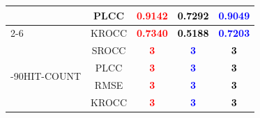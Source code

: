 \documentclass{article}
\begin{document}
\begin{table}
\begin{tabular}{||l|l|l||ccc||}
&\multicolumn{2}{c||}{PLCC}&\textbf{\textcolor{red}{0.9142}}&\textbf{\textcolor{black}{0.7292}}&\textbf{\textcolor{blue}{0.9049}}
\\ \cmidrule{2-6}
&\multicolumn{2}{c||}{KROCC}&\textbf{\textcolor{red}{0.7340}}&\textbf{\textcolor{black}{0.5188}}&\textbf{\textcolor{blue}{0.7203}}
\\ \midrule \midrule
\multirow{4}{*}{\begin{turn}{-90}HIT-COUNT\end{turn}}&\multicolumn{2}{c||}{SROCC}&\textbf{\textcolor{red}{3}}&\textbf{\textcolor{blue}{3}}&\textbf{\textcolor{black}{3}}
\\ \cmidrule{2-6}
&\multicolumn{2}{c||}{PLCC}&\textbf{\textcolor{red}{3}}&\textbf{\textcolor{blue}{3}}&\textbf{\textcolor{black}{3}}
\\ \cmidrule{2-6}
&\multicolumn{2}{c||}{RMSE}&\textbf{\textcolor{red}{3}}&\textbf{\textcolor{blue}{3}}&\textbf{\textcolor{black}{3}}
\\ \cmidrule{2-6}
&\multicolumn{2}{c||}{KROCC}&\textbf{\textcolor{red}{3}}&\textbf{\textcolor{blue}{3}}&\textbf{\textcolor{black}{3}}
\\ \midrule \midrule
\end{tabular}
\end{table}
\end{document}

